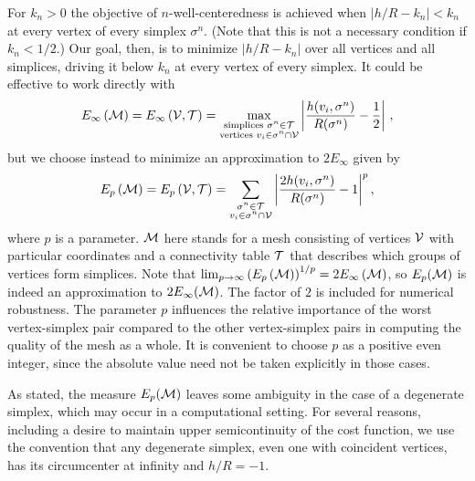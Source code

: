\documentclass[final]{siamltex}
\begin{document}
For $k_{n} > 0$ the objective of $n$-well-centeredness is achieved
when $\lvert h/R - k_{n}\rvert < k_{n}$ at every vertex of every
simplex $\sigma^{n}$.  (Note that this is not a necessary condition if
$k_{n} < 1/2$.)
Our goal, then, is to minimize $\left\lvert h/R - k_{n}\right\rvert$
over all vertices and all simplices, driving it below $k_{n}$ at every
vertex of every simplex.  It could be effective to work directly with
\begin{equation}
  \label{eq:genE_infty}
  E_{\infty}\left(\mathcal{M}\right) = E_{\infty}\left(\mathcal{V}, \mathcal{T}\right)
  = \max_{\substack{\text{simplices~}\sigma^{n} \in \mathcal{T}\\
      \text{vertices~}v_{i} \in \sigma^{n} \cap \mathcal{V}}}
  \left\lvert \frac{h(v_{i}, \sigma^{n})}{R(\sigma^{n})}
    - \frac{1}{2}\right\rvert\, ,
\end{equation}
but we choose instead to minimize an approximation to $2 E_{\infty}$
given by
\begin{equation}
  \label{eq:genE_p}
  E_{p}\left(\mathcal{M}\right) = E_{p}\left(\mathcal{V}, \mathcal{T}\right) =
  \sum_{\substack{\sigma^{n} \in \mathcal{T}\\
      v_{i} \in \sigma^{n} \cap \mathcal{V}}}
  \left\lvert \frac{2 h(v_{i}, \sigma^{n})}{R(\sigma^{n})}
    - 1\right\rvert^{p},
\end{equation}
where $p$ is a parameter.  $\mathcal{M}$ here stands for a mesh consisting
of vertices $\mathcal{V}$ with particular coordinates and a connectivity
table $\mathcal{T}$ that describes which groups of vertices form simplices.
Note that $\lim_{p\to\infty}
\left(E_{p}\left(\mathcal{M}\right)\right)^{1/p} = 2
E_{\infty}\left(\mathcal{M}\right)$, so $E_{p}(\mathcal{M})$ is indeed an
approximation to $2 E_{\infty}(\mathcal{M})$.  The factor of $2$ is
included for numerical robustness.  The parameter $p$ influences the
relative importance of the worst vertex-simplex pair compared to the
other vertex-simplex pairs in computing the quality of the mesh as a
whole.  It is convenient to choose $p$ as a positive even integer,
since the absolute value need not be taken explicitly in those cases.

As stated, the measure $E_{p}(\mathcal{M})$ leaves some ambiguity in the
case of a degenerate simplex, which may occur in a computational
setting.  For several reasons, including a desire to maintain upper
semicontinuity of the cost function, we
use the convention that any degenerate
simplex, even one with coincident vertices, has its circumcenter at
infinity and $h/R = -1$.
\end{document}
